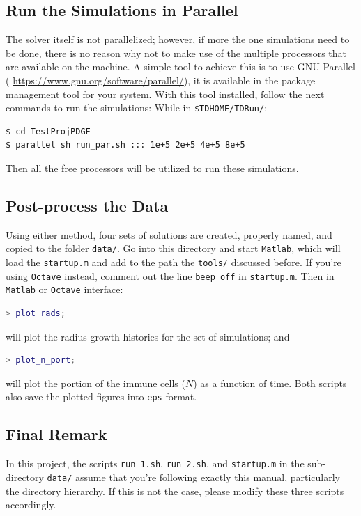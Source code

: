 \documentclass{amsproc}
\theoremstyle{definition}
\theoremstyle{remark}
\numberwithin{equation}{section}
\numberwithin{figure}{section}
\begin{document}
\subsection{Run the Simulations in Parallel}
The solver itself is not parallelized; however, if more the one simulations need to be done, there is no reason why not to make use of the multiple processors that are available on the machine.
A simple tool to achieve this is to use GNU Parallel ({\color{blue} \url{https://www.gnu.org/software/parallel/}}), it is available in the package management tool for your system.
With this tool installed, follow the next commands to run the simulations: While in \texttt{\$TDHOME/TDRun/}:
\begin{lstlisting}[backgroundcolor = \color{lightgray}, language = bash, xleftmargin = 0.1cm, framexleftmargin = 0.0cm]
$ cd TestProjPDGF
$ parallel sh run_par.sh ::: 1e+5 2e+5 4e+5 8e+5
\end{lstlisting}
Then all the free processors will be utilized to run these simulations.

\subsection{Post-process the Data}
Using either method, four sets of solutions are created, properly named, and copied to the folder \texttt{data/}.
Go into this directory and start \texttt{Matlab}, which will load the \texttt{startup.m} and add to the path the \texttt{tools/} discussed before.
If you're using \texttt{Octave} instead, comment out the line \texttt{beep off} in \texttt{startup.m}.
Then in \texttt{Matlab} or \texttt{Octave} interface:
\begin{lstlisting}[backgroundcolor = \color{lightgray}, language = Matlab, xleftmargin = 0.1cm, framexleftmargin = 0.1cm]
> plot_rads;
\end{lstlisting}
will plot the radius growth histories for the set of simulations; and
\begin{lstlisting}[backgroundcolor = \color{lightgray}, language = Matlab, xleftmargin = 0.1cm, framexleftmargin = 0.1cm]
> plot_n_port;
\end{lstlisting}
will plot the portion of the immune cells ($N$) as a function of time.
Both scripts also save the plotted figures into \texttt{eps} format.

\subsection{Final Remark}
In this project, the scripts \texttt{run\_1.sh}, \texttt{run\_2.sh}, and \texttt{startup.m} in the sub-directory \texttt{data/} assume that you're following exactly this manual, particularly the directory hierarchy.
If this is not the case, please modify these three scripts accordingly.
\end{document}
